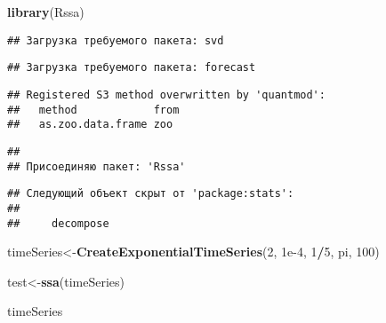 \documentclass[
]{article}
\newenvironment{Shaded}{\begin{snugshade}}{\end{snugshade}}
\newcommand{\DecValTok}[1]{\textcolor[rgb]{0.00,0.00,0.81}{#1}}
\newcommand{\FloatTok}[1]{\textcolor[rgb]{0.00,0.00,0.81}{#1}}
\newcommand{\FunctionTok}[1]{\textcolor[rgb]{0.13,0.29,0.53}{\textbf{#1}}}
\newcommand{\NormalTok}[1]{#1}
\newcommand{\OtherTok}[1]{\textcolor[rgb]{0.56,0.35,0.01}{#1}}
\newcommand{\SpecialCharTok}[1]{\textcolor[rgb]{0.81,0.36,0.00}{\textbf{#1}}}
\begin{document}
\begin{Shaded}
\begin{Highlighting}[]
\FunctionTok{library}\NormalTok{(Rssa)}
\end{Highlighting}
\end{Shaded}

\begin{verbatim}
## Загрузка требуемого пакета: svd
\end{verbatim}

\begin{verbatim}
## Загрузка требуемого пакета: forecast
\end{verbatim}

\begin{verbatim}
## Registered S3 method overwritten by 'quantmod':
##   method            from
##   as.zoo.data.frame zoo
\end{verbatim}

\begin{verbatim}
## 
## Присоединяю пакет: 'Rssa'
\end{verbatim}

\begin{verbatim}
## Следующий объект скрыт от 'package:stats':
## 
##     decompose
\end{verbatim}

\begin{Shaded}
\begin{Highlighting}[]
\NormalTok{timeSeries}\OtherTok{\textless{}{-}}\FunctionTok{CreateExponentialTimeSeries}\NormalTok{(}\DecValTok{2}\NormalTok{, }\FloatTok{1e{-}4}\NormalTok{, }\DecValTok{1}\SpecialCharTok{/}\DecValTok{5}\NormalTok{, pi, }\DecValTok{100}\NormalTok{)}

\NormalTok{test}\OtherTok{\textless{}{-}}\FunctionTok{ssa}\NormalTok{(timeSeries)}

\NormalTok{timeSeries}
\end{Highlighting}
\end{Shaded}
\end{document}
